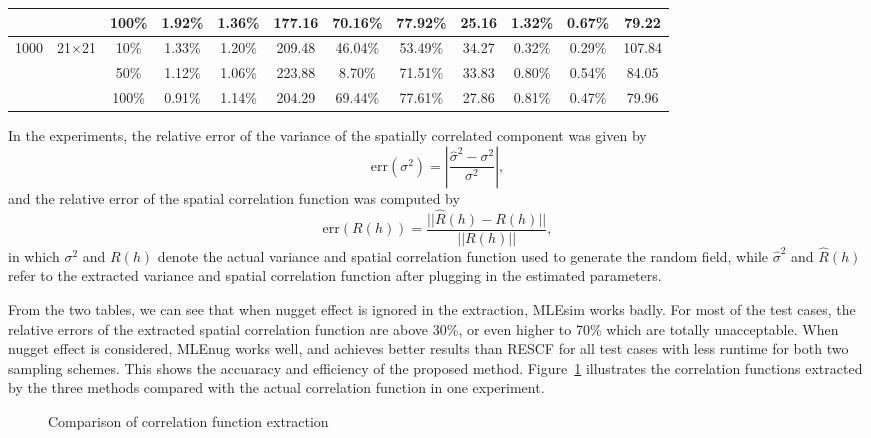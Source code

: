 \documentclass[referee]{ieice}
\begin{document}
\begin{table*}[tb]
{\begin{center}
\begin{tabular}{|c|c|c|c|c|c|c|c|c|c|c|c|}
              & & 100\% & 1.92\% & 1.36\% & 177.16 & 70.16\% & 77.92\% & 25.16 & 1.32\% & 0.67\% & 79.22 \\ \cline{3-12} \hline
        1000 & 21$\times$21 & 10\% & 1.33\% & 1.20\% & 209.48 & 46.04\% & 53.49\% & 34.27 & 0.32\% & 0.29\% & 107.84 \\ \cline{3-12}
              & & 50\% & 1.12\% & 1.06\% & 223.88 & 8.70\% & 71.51\% & 33.83 & 0.80\% & 0.54\% & 84.05 \\ \cline{3-12}
              & & 100\% & 0.91\% & 1.14\% & 204.29 & 69.44\% & 77.61\% & 27.86 & 0.81\% & 0.47\% & 79.96 \\ \cline{3-12} \hline
      \end{tabular}
    \end{center}
}
\end{table*}

In the experiments, the relative error of the variance of the spatially correlated component was given by
\begin{equation}
\mathrm{err}(\sigma^2)=|\frac{\hat{\sigma}^2-\sigma^2}{\sigma^2}|,
\end{equation}
and the relative error of the spatial correlation function was computed by
\begin{equation}
\mathrm{err}(R(h))=\frac{||\hat{R}(h)-R(h)||}{||R(h)||},
\end{equation}
in which $\sigma^2$ and $R(h)$ denote the actual variance and spatial correlation function used
to generate the random field, while $\hat{\sigma}^2$ and $\hat{R}(h)$ refer to the extracted
variance and spatial correlation function after plugging in the estimated parameters.

From the two tables, we can see that when nugget effect is ignored in the extraction, MLEsim works badly.
For most of the test cases, the relative errors of the extracted spatial correlation function are above 30\%,
or even higher to 70\% which are totally unacceptable.
When nugget effect is considered, MLEnug works well,
and achieves better results than RESCF for all test cases with less runtime for both two sampling schemes.
This shows the accuaracy and efficiency of the proposed method.
Figure~\ref{fig:corr_funs} illustrates the correlation functions extracted by the three methods compared with
the actual correlation function in one experiment.
\begin{figure}[tb]
  \begin{center}
    \caption{Comparison of correlation function extraction } \label{fig:corr_funs}
  \end{center}
\end{figure}
\end{document}
